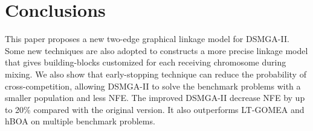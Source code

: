 \documentclass{sig-alternate-05-2015}
\begin{document}
\section{Conclusions}
This paper proposes a new two-edge graphical linkage model for DSMGA-II. 
Some new techniques are also adopted to constructs a more precise linkage model that gives building-blocks customized for each receiving chromosome during mixing.
We also show that early-stopping technique can reduce the probability of cross-competition, allowing DSMGA-II to solve the benchmark problems with a smaller population and less NFE.
The improved DSMGA-II decrease NFE by up to 20\% compared with the original version. It also outperforms LT-GOMEA and hBOA on multiple benchmark problems. 



%

%
%
\end{document}
